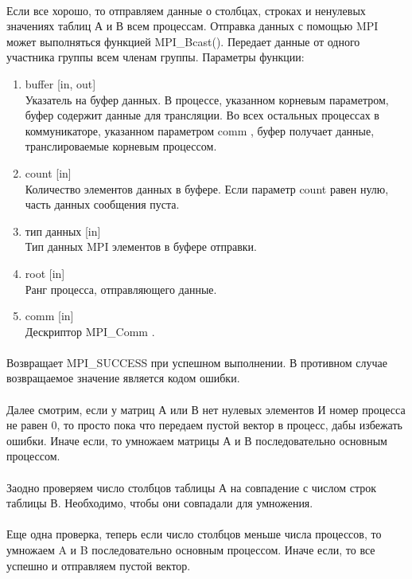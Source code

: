 \documentclass[12pt,a4paper]{article}
\begin{document}
\paragraph{}Если все хорошо, то отправляем данные о столбцах, строках и ненулевых значениях таблиц А и В  всем процессам. Отправка данных с помощью MPI может выполняться функцией MPI\_Bcast(). Передает данные от одного участника группы всем членам группы. Параметры функции:
\begin{enumerate} 
\item buffer [in, out]\\
Указатель на буфер данных. В процессе, указанном корневым параметром, буфер содержит данные для трансляции. Во всех остальных процессах в коммуникаторе, указанном параметром comm , буфер получает данные, транслироваемые корневым процессом.
\item count [in]\\
Количество элементов данных в буфере. Если параметр count равен нулю, часть данных сообщения пуста.
\item тип данных [in]\\
Тип данных MPI элементов в буфере отправки.
\item root [in]\\
Ранг процесса, отправляющего данные.
\item comm [in]\\
Дескриптор MPI\_Comm .
\end{enumerate} 
\paragraph{}Возвращает MPI\_SUCCESS при успешном выполнении. В противном случае возвращаемое значение является кодом ошибки.
\paragraph{}Далее смотрим, если у матриц А или В нет нулевых элементов И номер процесса не равен 0, то просто пока что передаем пустой вектор в процесс, дабы избежать ошибки. Иначе если, то умножаем матрицы А и В последовательно основным процессом.
\paragraph{}Заодно проверяем число столбцов таблицы А на совпадение с числом строк таблицы В. Необходимо, чтобы они совпадали для умножения.
\paragraph{}Еще одна проверка, теперь если число столбцов меньше числа процессов, то умножаем A и B последовательно основным процессом. Иначе если, то все успешно и отправляем пустой вектор. 
\end{document}
